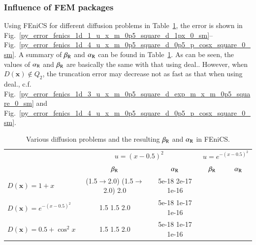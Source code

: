 \documentclass[review,3p]{elsarticle}
\begin{document}
\subsubsection{Influence of FEM packages}
Using FEniCS for different diffusion problems in Table~\ref{results_various_d_for_beta_r_decrease_1d_fenics}, the error is shown in Fig.~\ref{py_error_fenics_1d_1_u_x_m_0p5_square_d_1px_0_sm}--Fig.~\ref{py_error_fenics_1d_4_u_x_m_0p5_square_d_0p5_p_cosx_square_0_sm}. A summary of $\beta_{\rm R}$ and $\alpha_{\rm R}$ can be found in Table~\ref{results_various_d_for_beta_r_decrease_1d_fenics}. 
As can be seen, the values of $\alpha_{\rm R}$ and $\beta_{\rm R}$ are basically the same with that using deal..
However, when $D(\mathbf{x}) \notin Q_2$, the truncation error may decrease not as fast as that when using deal., c.f. Fig.~\ref{py_error_fenics_1d_3_u_x_m_0p5_square_d_exp_m_x_m_0p5_square_0_sm} and Fig.~\ref{py_error_fenics_1d_4_u_x_m_0p5_square_d_0p5_p_cosx_square_0_sm}.

\begin{table}[!ht]
\caption{Various diffusion problems and the resulting $\beta_{\rm R}$ and $\alpha_{\rm R}$ in FEniCS.}
\centering
\begin{tabular}{l|c|c|c|c}
 \multirow{2}{*}{} & \multicolumn{2}{c|}{$u=(x-0.5)^2$} & \multicolumn{2}{c}{$u=e^{-(x-0.5)^2}$} \\ \cline{2-5}
  & $\beta_{\rm R}$ & $\alpha_{\rm R}$ & $\beta_{\rm R}$ & $\alpha_{\rm R}$ \\ \hline
 $D(\mathbf{x}) = 1+x$ & (1.5$\rightarrow$2.0) (1.5$\rightarrow$2.0) 2.0 & 5e-18 2e-17 1e-16 & \cellcolor{lightgray} & \cellcolor{lightgray} \\ \hline
 $D(\mathbf{x}) = e^{-(x-0.5)^2}$ & {1.5 1.5} 2.0 & 5e-18 1e-17 1e-16 & \cellcolor{lightgray} & \cellcolor{lightgray} \\ \hline
 $D(\mathbf{x}) = 0.5+\cos ^2 x$ & {1.5 1.5} 2.0 & 5e-18 1e-17 1e-16 & \cellcolor{lightgray} & \cellcolor{lightgray}
\end{tabular}
\label{results_various_d_for_beta_r_decrease_1d_fenics}
\end{table}
\end{document}
